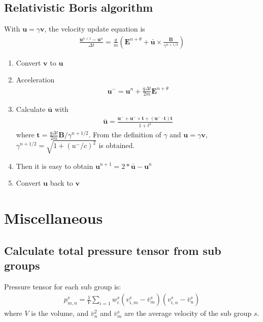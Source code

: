 \documentclass[a4paper, 11pt]{article}
\begin{document}
\subsection{Relativistic Boris algorithm}

With $\mathbf{u} = \gamma \mathbf{v}$, the velocity update equation is
\begin{eqnarray}
\frac{\mathbf{u}^{n+1} - \mathbf{u}^{n}}{\Delta t} = \frac{q}{m}(\mathbf{E}^{n+\theta} + \bar{\mathbf{u}}\times \frac{\mathbf{B}}{\gamma ^{n+1/2}})
\end{eqnarray}

\begin{enumerate}
    \item Convert $\mathbf{v}$ to $\mathbf{u}$
    \item Acceleration
\begin{eqnarray}
    \mathbf{u}^- = \mathbf{u}^{n} + \frac{q\Delta t}{2m}\mathbf{E}^{n+\theta}
\end{eqnarray}

\item Calculate $\bar{\mathbf{u}}$ with
\begin{eqnarray}
\bar{\mathbf{u}} = \frac{\mathbf{u}^- + \mathbf{u}^- \times \mathbf{t} + (\mathbf{u}^- \cdot \mathbf{t})\mathbf{t}}{1+t^2}
\end{eqnarray}
where $\mathbf{t} = \frac{q\Delta t}{2m} \mathbf{B}/\gamma^{n+1/2}$. From the definition of $\gamma$ and $\mathbf{u} = \gamma \mathbf{v}$, $\gamma ^{n+1/2} = \sqrt{1+(u^-/c)^2}$ is obtained. 

\item Then it is easy to obtain $\mathbf{u}^{n+1} = 2*\bar{\mathbf{u}} - \mathbf{u}^{n}$
\item  Convert $\mathbf{u}$ back to $\mathbf{v}$
\end{enumerate}

\section{Miscellaneous}
\subsection{Calculate total pressure tensor from sub groups}
Pressure tensor for each sub group is:
\begin{eqnarray}
    p^s_{m,n} = \frac{1}{V} \sum_{i=1} w_i^s (v_{i,m}^s-\bar{v}_m^s) (v_{i,n}^s-\bar{v}_n^s) 
\end{eqnarray}
where $V$ is the volume, and $\bar{v}_n^2$ and $\bar{v}_m^s$ are the average velocity of the sub group $s$. 
\end{document}
